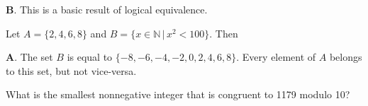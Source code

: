 \documentclass[addpoints]{exam}
\begin{document}
\begin{questions}

\begin{solution}
	\textbf{B}. This is a basic result of logical equivalence. 
\end{solution}

\question[2] Let $A = \{ 2, 4, 6, 8\}$ and $B = \{ x \in \mathbb{N} \, | \, x^2 < 100 \}$. Then

\begin{solution}
	\textbf{A}. The set $B$ is equal to $\{ -8, -6, -4, -2, 0, 2, 4, 6, 8 \}$. Every element of $A$ belongs to this set, but not vice-versa. 
\end{solution}


\question[2] What is the smallest nonnegative integer that is congruent to 1179 modulo 10?
\end{questions}
\end{document}

